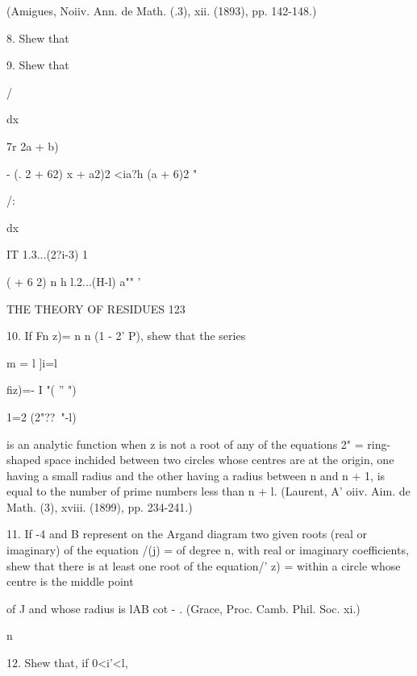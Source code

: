 {(Amigues, Noiiv. Ann. de Math. (.3), xii. (1893), pp. 142-148.)



8. Shew that



9. Shew that



/



dx



7r 2a + b)



- (. 2 + 62) x + a2)2 <ia?h (a + 6)2 "



/:



dx



IT 1.3...(2?i-3) 1



( + 6 2) n h l.2...(H-l) a"" '



THE THEORY OF RESIDUES 123



10. If Fn z)= n n (1 - 2' P), shew that the series

m = l ]i=l

fiz)=- I "( '' ")



1=2 (2"??~"-l)%

is an analytic function when z is not a root of any of the equations
2" = %
ring-shaped space inchided between two circles whose centres are at
the origin, one having a small radius and the other having a radius
between n and n + 1, is equal to the number of prime numbers less than
n + l. (Laurent, A' oiiv. Aim. de Math. (3), xviii. (1899), pp.
234-241.)

11. If -4 and B represent on the Argand diagram two given roots (real
or imaginary) of the equation /(j) = of degree n, with real or
imaginary coefficients, shew that there is at least one root of the
equation/' z) = within a circle whose centre is the middle point

of J and whose radius is lAB cot - . (Grace, Proc. Camb. Phil. Soc.
xi.)

n



12. Shew that, if 0<i'<l,



}
